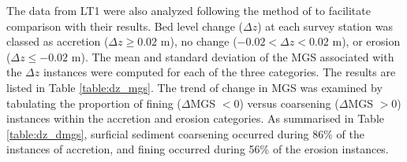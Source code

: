 
The data from LT1 were also analyzed following the method of \citet{Masselink_etal2007} to facilitate comparison with their results. Bed level change ($\Delta z$) at each survey station was classed as accretion ($\Delta z \geq 0.02$ m), no change ($-0.02 < \Delta z < 0.02$ m), or erosion ($\Delta z \leq -0.02$ m). The mean and standard deviation of the MGS associated with the $\Delta z$ instances were computed for each of the three categories. The results are listed in Table \ref{table:dz_mgs}. The trend of change in MGS was examined by tabulating the proportion of fining ($\Delta$MGS $< 0$) versus coarsening ($\Delta$MGS $> 0$) instances within the accretion and erosion categories. As summarised in Table \ref{table:dz_dmgs}, surficial sediment coarsening occurred during 86\% of the instances of accretion, and fining occurred during 56\% of the erosion instances. %

